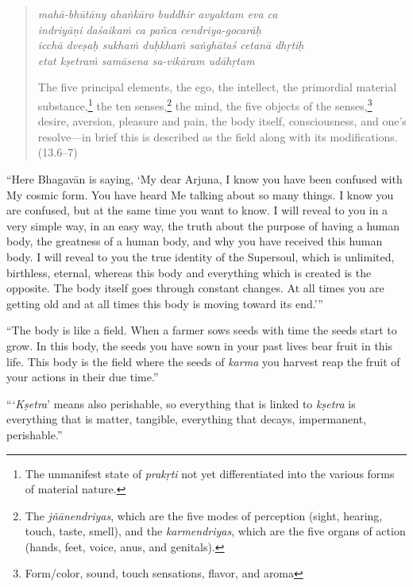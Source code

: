 \documentclass[12pt, twoside, openright]{memoir}
\begin{document}
\par
\begin{verse}
\textit{mahā-bhūtāny ahaṅkāro buddhir avyaktam eva ca} \\
\textit{indriyāṇi daśaikaṁ ca pañca cendriya-gocarāḥ} \\
\textit{icchā dveṣaḥ sukhaṁ duḥkhaṁ saṅghātaś cetanā dhṛtiḥ} \\
\textit{etat kṣetraṁ samāsena sa-vikāram udāhṛtam}

\noindent The five principal elements, the ego, the intellect, the primordial material substance,\footnote{The unmanifest state of \textit{prakṛti} not yet differentiated into the various forms of material nature.} the ten senses,\footnote{The \textit{jñānendriyas}, which are the five modes of perception (sight, hearing, touch, taste, smell), and the \textit{karmendriyas}, which are the five organs of action (hands, feet, voice, anus, and genitals).} the mind, the five objects of the senses,\footnote{Form/color, sound, touch sensations, flavor, and aroma} desire, aversion, pleasure and pain, the body itself, consciousness, and one’s resolve---in brief this is described as the field along with its modifications. (13.6–7)
\end{verse}
\par


\enquote{Here Bhagavān is saying, \enquote{My dear Arjuna, I know you have been confused with My cosmic form. You have heard Me talking about so many things. I know you are confused, but at the same time you want to know. I will reveal to you in a very simple way, in an easy way, the truth about the purpose of having a human body, the greatness of a human body, and why you have received this human body. I will reveal to you the true identity of the Supersoul, which is unlimited, birthless, eternal, whereas this body and everything which is created is the opposite. The body itself goes through constant changes. At all times you are getting old and at all times this body is moving toward its end.}}

\enquote{The body is like a field. When a farmer sows seeds with time the seeds start to grow. In this body, the seeds you have sown in your past lives bear fruit in this life. This body is the field where the seeds of \textit{karma} you harvest reap the fruit of your actions in their due time.}

\enquote{\enquote{\textit{Kṣetra}} means also perishable, so everything that is linked to \textit{kṣetra} is everything that is matter, tangible, everything that decays, impermanent, perishable.}
\end{document}
